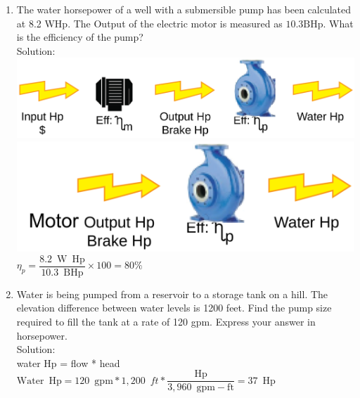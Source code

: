 \documentclass{article}
\begin{document}
\begin{enumerate}
\item The water horsepower of a well with a submersible pump has been calculated at 8.2 WHp. The Output of the electric motor is measured as $10.3 \mathrm{BHp}$. What is the efficiency of the pump?\\
  \vspace{0.2cm}
Solution:\\ 
  \vspace{0.2cm}
 \vspace{0.08cm}\includegraphics[scale=0.08]{PumpProblem}\\
 \vspace{0.2cm}
 \includegraphics[scale=0.32]{PumpingProblempump}
 \vspace{0.2cm}
$\eta_p=\dfrac{8.2 \mathrm{\enspace W \enspace Hp}}{10.3 \mathrm{\enspace BHp}} \times 100=\boxed{80 \%}$
 \vspace{0.2cm}

  \item Water is being pumped from a reservoir to a storage tank on a hill. The elevation difference between water levels is 1200 feet. Find the pump size required to fill the tank at a rate of 120 gpm. Express your answer in horsepower.\\
  \vspace{0.2cm} 
 Solution:\\
\vspace{0.4cm}
water Hp = flow * head\\
\vspace{0.4cm}
$\mathrm{Water} \enspace \mathrm{Hp} = 120 \enspace \mathrm{gpm}*1,200 \enspace ft*\dfrac{\mathrm{Hp}}{3,960 \enspace \mathrm{gpm-ft}}=\boxed{ 37 \enspace \mathrm{Hp}}$\\
\vspace{0.2cm}


\end{enumerate}
\end{document}
